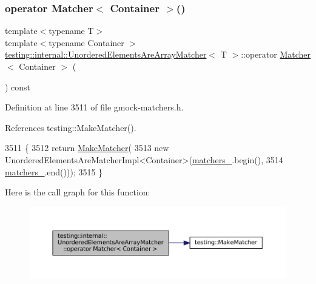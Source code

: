 \subsubsection{\texorpdfstring{operator Matcher$<$ Container $>$()}{operator Matcher< Container >()}}
{\footnotesize\ttfamily template$<$typename T$>$ \\
template$<$typename Container $>$ \\
\hyperlink{classtesting_1_1internal_1_1UnorderedElementsAreArrayMatcher}{testing\+::internal\+::\+Unordered\+Elements\+Are\+Array\+Matcher}$<$ T $>$\+::operator \hyperlink{classtesting_1_1Matcher}{Matcher}$<$ Container $>$ (\begin{DoxyParamCaption}{ }\end{DoxyParamCaption}) const\hspace{0.3cm}{\ttfamily [inline]}}



Definition at line 3511 of file gmock-\/matchers.\+h.



References testing\+::\+Make\+Matcher().


\begin{DoxyCode}
3511                                       \{
3512     \textcolor{keywordflow}{return} \hyperlink{namespacetesting_a37fd8029ac00e60952440a3d9cca8166}{MakeMatcher}(
3513         \textcolor{keyword}{new} UnorderedElementsAreMatcherImpl<Container>(\hyperlink{classtesting_1_1internal_1_1UnorderedElementsAreArrayMatcher_ab671d76fb1e06755245814635a27c025}{matchers\_}.begin(),
3514                                                        \hyperlink{classtesting_1_1internal_1_1UnorderedElementsAreArrayMatcher_ab671d76fb1e06755245814635a27c025}{matchers\_}.end()));
3515   \}
\end{DoxyCode}
Here is the call graph for this function\+:
\nopagebreak
\begin{figure}[H]
\begin{center}
\leavevmode
\includegraphics[width=350pt]{classtesting_1_1internal_1_1UnorderedElementsAreArrayMatcher_ab09b91c39147c51f9c970fd155f2da77_cgraph}
\end{center}
\end{figure}


